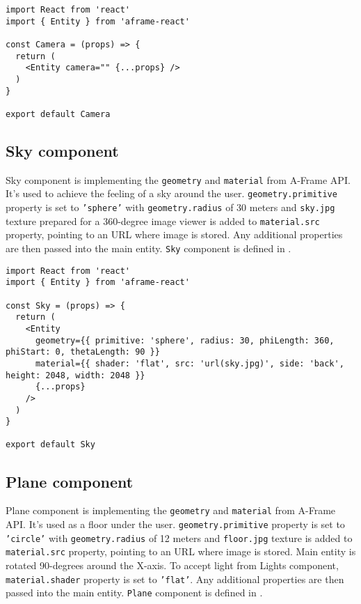 \begin{lstlisting}[caption={\textsl{Camera} component code.},captionpos=b]
import React from 'react'
import { Entity } from 'aframe-react'

const Camera = (props) => {
  return (
    <Entity camera="" {...props} />
  )
}

export default Camera
\end{lstlisting}

\subsection{Sky component}
Sky component is implementing the \texttt{geometry} and \texttt{material} from A-Frame API. It's used to achieve the feeling of a sky around the user. \texttt{geometry.primitive} property is set to \texttt{'sphere'} with \texttt{geometry.radius} of 30 meters and \texttt{sky.jpg} texture prepared for a 360-degree image viewer is added to \texttt{material.src} property, pointing to an URL where image is stored. Any additional properties are then passed into the main entity. \texttt{Sky} component is defined in .

\begin{lstlisting}[caption={\textsl{Sky} component code.},captionpos=b]
import React from 'react'
import { Entity } from 'aframe-react'

const Sky = (props) => {
  return (
    <Entity
      geometry={{ primitive: 'sphere', radius: 30, phiLength: 360, phiStart: 0, thetaLength: 90 }}
      material={{ shader: 'flat', src: 'url(sky.jpg)', side: 'back', height: 2048, width: 2048 }}
      {...props}
    />
  )
}

export default Sky
\end{lstlisting}

\subsection{Plane component}
Plane component is implementing the \texttt{geometry} and \texttt{material} from A-Frame API. It's used as a floor under the user. \texttt{geometry.primitive} property is set to \texttt{'circle'} with \texttt{geometry.radius} of 12 meters and \texttt{floor.jpg} texture is added to \texttt{material.src} property, pointing to an URL where image is stored. Main entity is rotated 90-degrees around the X-axis. To accept light from Lights component, \texttt{material.shader} property is set to \texttt{'flat'}. Any additional properties are then passed into the main entity. \texttt{Plane} component is defined in .

